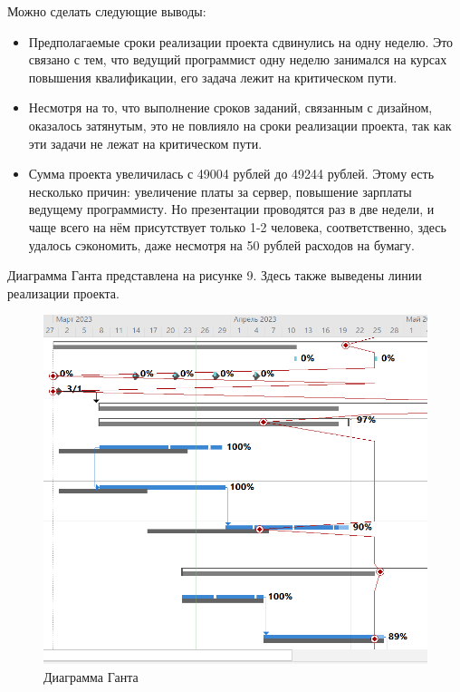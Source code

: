 Можно сделать следующие выводы:
\begin{itemize}
	\item Предполагаемые сроки реализации проекта сдвинулись на одну неделю. Это связано с тем, что ведущий программист одну неделю занимался на курсах повышения квалификации, его задача лежит на критическом пути.
	\item Несмотря на то, что выполнение сроков заданий, связанным с дизайном, оказалось затянутым, это не повлияло на сроки реализации проекта, так как эти задачи не лежат на критическом пути.
	\item Сумма проекта увеличилась с 49004 рублей до 49244 рублей. Этому есть несколько причин: увеличение платы за сервер, повышение зарплаты ведущему программисту. Но презентации проводятся раз в две недели, и чаще всего на нём присутствует только 1-2 человека, соответственно, здесь удалось сэкономить, даже несмотря на 50 рублей расходов на бумагу.
\end{itemize}

\newpage
Диаграмма Ганта представлена на рисунке 9. Здесь также выведены линии реализации проекта.
\FloatBarrier
\begin{figure}[h]	
	\begin{center}
		\includegraphics[width=\linewidth]{inc/gant.png}
	\end{center}
	\captionsetup{justification=centering}
	\caption{Диаграмма Ганта}
\end{figure}
\FloatBarrier

